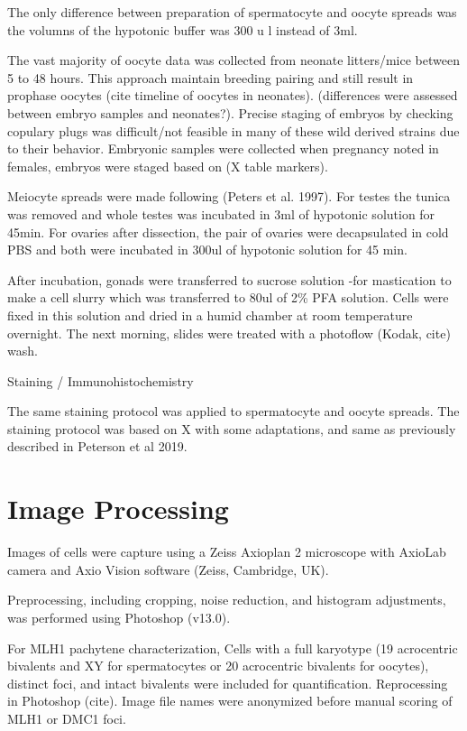 \documentclass[]{article}
\begin{document}
The only difference between preparation of spermatocyte and oocyte
spreads was the volumns of the hypotonic buffer was 300 u l instead of
3ml.

The vast majority of oocyte data was collected from neonate litters/mice
between 5 to 48 hours. This approach maintain breeding pairing and still
result in prophase oocytes (cite timeline of oocytes in neonates).
(differences were assessed between embryo samples and neonates?).
Precise staging of embryos by checking copulary plugs was difficult/not
feasible in many of these wild derived strains due to their behavior.
Embryonic samples were collected when pregnancy noted in females,
embryos were staged based on (X table markers).

Meiocyte spreads were made following (Peters et al. 1997). For testes
the tunica was removed and whole testes was incubated in 3ml of
hypotonic solution for 45min. For ovaries after dissection, the pair of
ovaries were decapsulated in cold PBS and both were incubated in 300ul
of hypotonic solution for 45 min.

After incubation, gonads were transferred to sucrose solution -for
mastication to make a cell slurry which was transferred to 80ul of 2\%
PFA solution. Cells were fixed in this solution and dried in a humid
chamber at room temperature overnight. The next morning, slides were
treated with a photoflow (Kodak, cite) wash.

Staining / Immunohistochemistry

The same staining protocol was applied to spermatocyte and oocyte
spreads. The staining protocol was based on X with some adaptations, and
same as previously described in Peterson et al 2019.

\section{Image Processing}\label{image-processing}

Images of cells were capture using a Zeiss Axioplan 2 microscope with
AxioLab camera and Axio Vision software (Zeiss, Cambridge, UK).

Preprocessing, including cropping, noise reduction, and histogram
adjustments, was performed using Photoshop (v13.0).

For MLH1 pachytene characterization, Cells with a full karyotype (19
acrocentric bivalents and XY for spermatocytes or 20 acrocentric
bivalents for oocytes), distinct foci, and intact bivalents were
included for quantification. Reprocessing in Photoshop (cite). Image
file names were anonymized before manual scoring of MLH1 or DMC1 foci.
\end{document}
